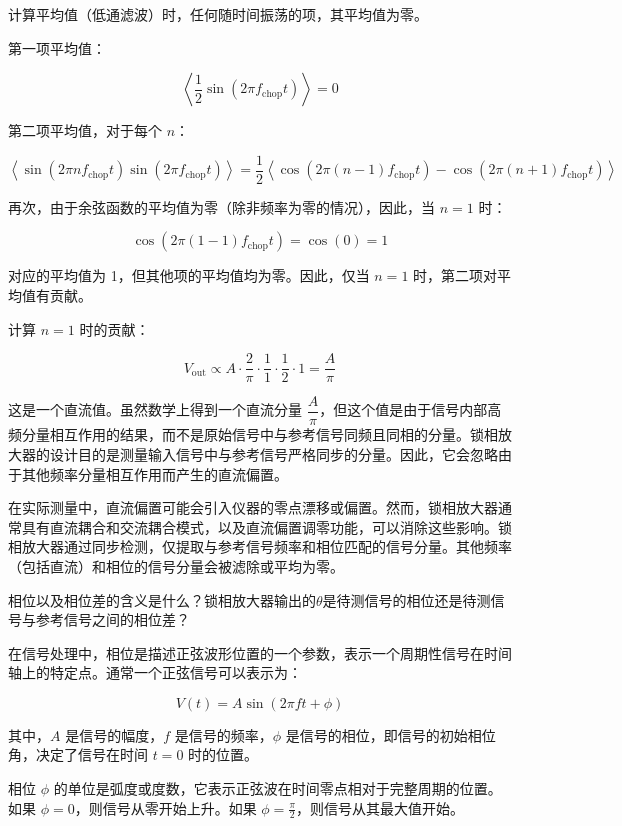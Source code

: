 计算平均值（低通滤波）时，任何随时间振荡的项，其平均值为零。

第一项平均值：

\[
\left\langle \dfrac{1}{2} \sin(2\pi f_{\text{chop}} t) \right\rangle = 0
\]

第二项平均值，对于每个 \( n \)：

\[
\left\langle \sin(2\pi n f_{\text{chop}} t) \sin(2\pi f_{\text{chop}} t) \right\rangle = \dfrac{1}{2} \left\langle \cos(2\pi (n - 1) f_{\text{chop}} t) - \cos(2\pi (n + 1) f_{\text{chop}} t) \right\rangle
\]

再次，由于余弦函数的平均值为零（除非频率为零的情况），因此，当 \( n = 1 \) 时：

\[
\cos(2\pi (1 - 1) f_{\text{chop}} t) = \cos(0) = 1
\]

对应的平均值为 1，但其他项的平均值均为零。因此，仅当 \( n = 1 \) 时，第二项对平均值有贡献。

计算 \( n = 1 \) 时的贡献：

\[
V_{\text{out}} \propto A \cdot \dfrac{2}{\pi} \cdot \dfrac{1}{1} \cdot \dfrac{1}{2} \cdot 1 = \dfrac{A}{\pi}
\]

这是一个直流值。虽然数学上得到一个直流分量 \( \dfrac{A}{\pi} \)，但这个值是由于信号内部高频分量相互作用的结果，而不是原始信号中与参考信号同频且同相的分量。锁相放大器的设计目的是测量输入信号中与参考信号严格同步的分量。因此，它会忽略由于其他频率分量相互作用而产生的直流偏置。

在实际测量中，直流偏置可能会引入仪器的零点漂移或偏置。然而，锁相放大器通常具有直流耦合和交流耦合模式，以及直流偏置调零功能，可以消除这些影响。锁相放大器通过同步检测，仅提取与参考信号频率和相位匹配的信号分量。其他频率（包括直流）和相位的信号分量会被滤除或平均为零。

\begin{question}
	相位以及相位差的含义是什么？锁相放大器输出的$\theta$是待测信号的相位还是待测信号与参考信号之间的相位差？
\end{question}
在信号处理中，相位是描述正弦波形位置的一个参数，表示一个周期性信号在时间轴上的特定点。通常一个正弦信号可以表示为：

\[
V(t) = A \sin(2\pi f t + \phi)
\]

其中，\( A \) 是信号的幅度，\( f \) 是信号的频率，\( \phi \) 是信号的相位，即信号的初始相位角，决定了信号在时间 \( t = 0 \) 时的位置。

相位 \( \phi \) 的单位是弧度或度数，它表示正弦波在时间零点相对于完整周期的位置。如果 \( \phi = 0 \)，则信号从零开始上升。如果 \( \phi = \frac{\pi}{2} \)，则信号从其最大值开始。

